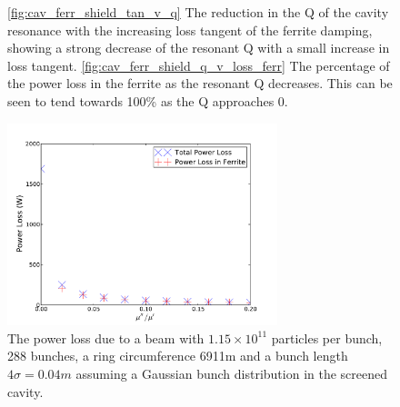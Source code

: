 \begin{figure}
\caption{\ref{fig:cav_ferr_shield_tan_v_q} The reduction in the Q of the cavity resonance with the increasing loss tangent of the ferrite damping, showing a strong decrease of the resonant Q with a small increase in loss tangent. \ref{fig:cav_ferr_shield_q_v_loss_ferr} The percentage of the power loss in the ferrite as the resonant Q decreases. This can be seen to tend towards 100\% as the Q approaches 0.}
\label{fig:screen_res_alterations}
\end{figure}

\begin{figure}
\begin{center}
\includegraphics[width=0.7\textwidth]{Beam_Coupling_Impedance_Reduction_Techniques/figures/screen_loss_tan_vs_power.pdf}
\end{center}
\caption{The power loss due to a beam with $1.15 \times 10^{11}$ particles per bunch, 288 bunches, a ring circumference 6911m and a bunch length $4\sigma = 0.04m$ assuming a Gaussian bunch distribution in the screened cavity.}
\label{fig:screen_loss_tan_v_power}
\end{figure}

